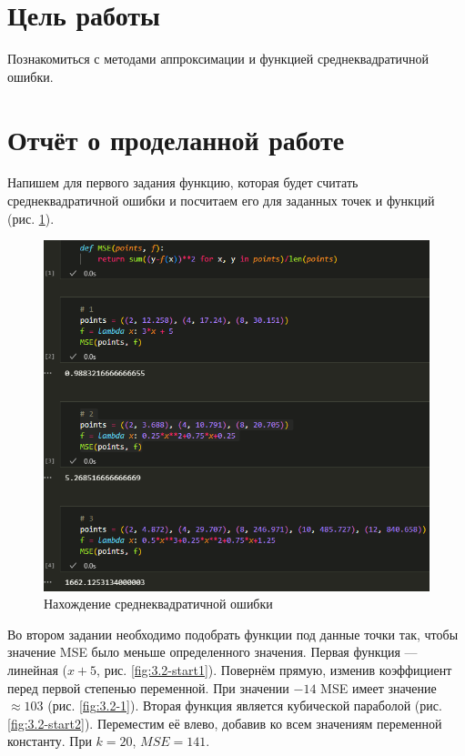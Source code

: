 \documentclass[14pt,a4paper]{extarticle}
\begin{document}


\section*{Цель работы}
        Познакомиться с методами аппроксимации и функцией среднеквадратичной ошибки.


\section*{Отчёт о проделанной работе}
        Напишем для первого задания функцию, которая будет считать среднеквадратичной
ошибки и посчитаем его для заданных точек и функций (рис. \ref{fig:3.1}).

\begin{figure}[h!]
    \centering
    \includegraphics[width=0.7\linewidth]{figures/3.1.png}
    \caption{Нахождение среднеквадратичной ошибки}
    \label{fig:3.1}
\end{figure}

        Во втором задании необходимо подобрать функции под данные точки так, чтобы
значение MSE было меньше определенного значения. Первая функция --- линейная
($x+5$, рис. \ref{fig:3.2-start1}). Повернём прямую, изменив коэффициент перед
первой степенью переменной. При значении $-14$ MSE имеет значение $\approx 103$ (рис.  \ref{fig:3.2-1}).
Вторая функция является кубической параболой (рис. \ref{fig:3.2-start2}). Переместим
её влево, добавив ко всем значениям переменной константу. При $k=20$, $MSE=141$.
\newpage
\end{document}
